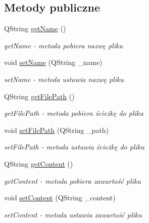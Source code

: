 \subsection*{Metody publiczne}
\begin{DoxyCompactItemize}
\item 
Q\+String \hyperlink{class_file_a55683b67c0f7f53d4f2ee544587a1478}{get\+Name} ()
\begin{DoxyCompactList}\small\item\em get\+Name -\/ metoda pobiera nazwę pliku \end{DoxyCompactList}\item 
void \hyperlink{class_file_a1a2f0af57b4cb416d07b4c7f4a1ef04a}{set\+Name} (Q\+String \+\_\+name)
\begin{DoxyCompactList}\small\item\em set\+Name -\/ metoda ustawia nazwę pliku \end{DoxyCompactList}\item 
Q\+String \hyperlink{class_file_a1fdbcf449f0e8365b3d5cf003909b1b5}{get\+File\+Path} ()
\begin{DoxyCompactList}\small\item\em get\+File\+Path -\/ metoda pobiera ścieżkę do pliku \end{DoxyCompactList}\item 
void \hyperlink{class_file_ad7216b449a5868da61388cde79070d6f}{set\+File\+Path} (Q\+String \+\_\+path)
\begin{DoxyCompactList}\small\item\em set\+File\+Path -\/ metoda ustawia ścieżkę do pliku \end{DoxyCompactList}\item 
Q\+String \hyperlink{class_file_ac80dd9634f10f53494c4fd5265483c21}{get\+Content} ()
\begin{DoxyCompactList}\small\item\em get\+Content -\/ metoda pobiera zawartość pliku \end{DoxyCompactList}\item 
void \hyperlink{class_file_a38cb05c7dde38d6bd8abb62e85e42404}{set\+Content} (Q\+String \+\_\+content)
\begin{DoxyCompactList}\small\item\em set\+Content -\/ metoda ustawia zawartość pliku \end{DoxyCompactList}\end{DoxyCompactItemize}
